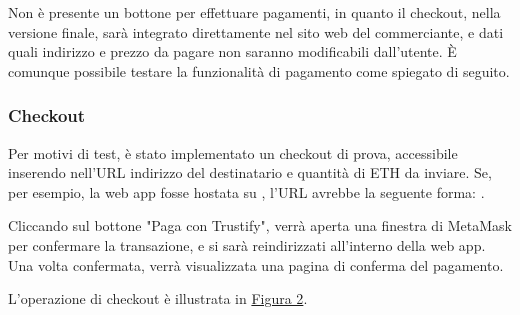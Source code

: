 Non è presente un bottone per effettuare pagamenti, in quanto il checkout, nella versione finale, sarà integrato direttamente nel sito web del commerciante, e dati quali indirizzo e prezzo da pagare non saranno modificabili dall'utente. È comunque possibile testare la funzionalità di pagamento come spiegato di seguito.
\subsubsection{Checkout}
Per motivi di test, è stato implementato un checkout di prova, accessibile inserendo nell'URL indirizzo del destinatario e quantità di ETH da inviare. Se, per esempio, la web app fosse hostata su , l'URL avrebbe la seguente forma: .

Cliccando sul bottone "Paga con Trustify", verrà aperta una finestra di MetaMask per confermare la transazione, e si sarà reindirizzati all'interno della web app. Una volta confermata, verrà visualizzata una pagina di conferma del pagamento.

L'operazione di checkout è illustrata in \hyperref[fig:checkout]{Figura 2}.

